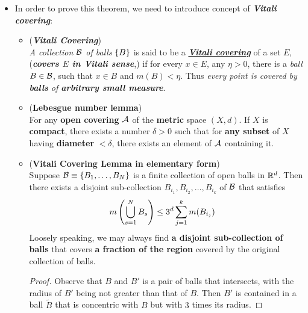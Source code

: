\documentclass[11pt]{article}
\begin{document}
\begin{itemize}
\item \begin{remark}
In order to prove this theorem, we need to introduce concept of \emph{\textbf{Vitali covering}}:
\begin{itemize}
\item \begin{definition}(\emph{\textbf{Vitali Covering}}) \citep{royden1988real, stein2009real}\\
\emph{A collection ${\mathcal B}$ of balls} $\left\{B\right\}$ is said to be a \underline{\emph{\textbf{Vitali covering}}} of a set $E$, (\emph{\textbf{covers $E$ in Vitali sense}},) if for every $x\in E$,  any $\eta>0$, there is a \emph{ball} $B\in {\mathcal B}$, such that $x\in B$ and $m(B)<\eta$. Thus \emph{every point is covered by \textbf{balls} of \textbf{arbitrary small measure}}.
\end{definition}

\item \begin{lemma}(\textbf{Lebesgue number lemma})\\
For any \textbf{open covering} ${\mathcal A}$ of the \textbf{metric} space $(X,d)$. If $X$ is \textbf{compact}, there exists a number $\delta>0$ such that for \textbf{any subset} of $X$ having \textbf{diameter} $<\delta$, there exists an element of ${\mathcal A}$ containing it. 
\end{lemma}

\item \begin{lemma}(\textbf{Vitali Covering Lemma in elementary form}) \citep{stein2009real}\\
Suppose ${\mathcal B} \equiv \left\{B_{1},\ldots, B_{N}\right\}$ is a finite collection of open balls in ${\mathbb R}^{d}$. Then there exists a disjoint sub-collection $B_{i_{1}}, B_{i_2}, \ldots, B_{i_k}$ of ${\mathcal B}$ that satisfies
\begin{align*}
m\left(\bigcup_{s=1}^{N}B_{s}\right) &\le 3^{d}\sum_{j=1}^{k}m(B_{i_{j}}) 
\end{align*}
Loosely speaking, we may always find \textbf{a disjoint sub-collection of balls} that covers \textbf{a fraction of the region} covered by the original collection of balls. 
\end{lemma}
\begin{proof}
Observe that $B$ and $B'$ is a pair of balls that intersects, with the radius of $B'$ being not greater than that of $B$. Then $B'$ is contained in a ball $\tilde{B}$ that is concentric with $B$ but with $3$ times its radius. 


\end{proof}
\end{itemize}
\end{remark}
\end{itemize}
\end{document}
